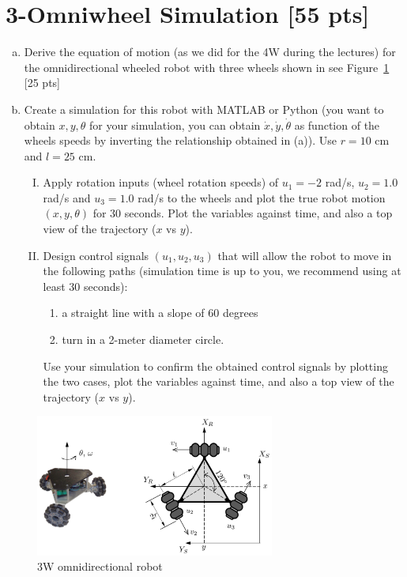 \section{3-Omniwheel Simulation [55 pts]}
\begin{enumerate}[(a)]
    \item Derive the equation of motion (as we did for the 4W during the lectures) for the omnidirectional wheeled robot with three wheels shown in see Figure~\ref{fig:3omni} [25 pts]
    
    \item Create a simulation for this robot with MATLAB or Python (you want to obtain $x,y,\theta$ for your simulation, you can obtain $\dot{x},\dot{y},\dot{\theta}$ as function of the wheels speeds by inverting the relationship obtained in (a)). Use $r=10$ cm and $l=25$ cm.
    \begin{enumerate}[I.]
        \item Apply rotation inputs (wheel rotation speeds) of $u_1=-2$ rad/s, $u_2=1.0$ rad/s and $u_3=1.0$ rad/s to the wheels and plot the true robot motion $(x,y,\theta)$ for 30 seconds. Plot the variables against time, and also a top view of the trajectory ($x$ vs $y$).
        \item Design control signals $(u_1,u_2,u_3)$ that will allow the robot to move in the following paths (simulation time is up to you, we recommend using at least 30 seconds):\begin{enumerate} [1)]
            \item a straight line with a slope of 60 degrees
            \item turn in a 2-meter diameter circle.
            \end{enumerate} 
        Use your simulation to confirm the obtained control signals by plotting the two cases, plot the variables against time, and also a top view of the trajectory ($x$ vs $y$). 
    \end{enumerate} 
\end{enumerate}
\begin{figure}[h!]
    \centering
    \includegraphics[width=0.7\textwidth]{img/omni.png}
    \caption{3W omnidirectional robot}
    \label{fig:3omni}
\end{figure}